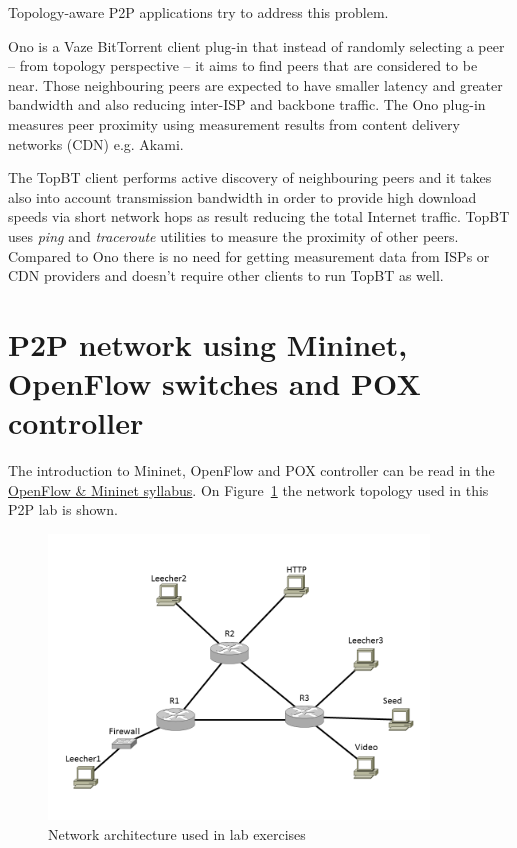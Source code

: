 \documentclass[a4paper]{article}
\begin{document}
Topology-aware P2P applications try to address this problem.

Ono is a Vaze BitTorrent client plug-in that instead of randomly selecting a peer -- from topology perspective -- it
aims to find peers that are considered to be near. Those neighbouring peers are expected to have smaller latency and
greater bandwidth and also reducing inter-ISP and backbone traffic. The Ono plug-in measures peer proximity using
measurement results from content delivery networks (CDN) e.g. Akami.

The TopBT client performs active discovery of neighbouring peers and it takes also into account transmission bandwidth
in order to provide high download speeds via short network hops as result reducing the total Internet traffic. TopBT
uses \emph{ping} and \emph{traceroute} utilities to measure the proximity of other peers. Compared to Ono there is no
need for getting measurement data from ISPs or CDN providers and doesn't require other clients to run TopBT as well.

\section{P2P network using Mininet, OpenFlow switches and POX controller}

The introduction to Mininet, OpenFlow and POX controller can be read in the
\href{https://qosip.tmit.bme.hu/foswiki/pub/Meres/OpenFlowMSc/OpenFlow-Mininet-syllabus-en.pdf}{OpenFlow \& Mininet
    syllabus}. On
Figure~\ref{fig:Lab-topo} the network topology used in this P2P lab is shown.

\begin{figure}[H]
    \centering
    \includegraphics[width=0.9\textwidth]{figures/halozat.png}
    \caption{Network architecture used in lab exercises}
    \label{fig:Lab-topo}
\end{figure}
\end{document}
